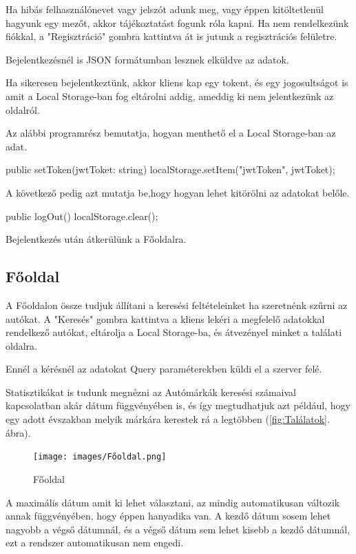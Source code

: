 Ha hibás felhasználónevet vagy jelszót adunk meg, vagy éppen kitöltetlenül hagyunk egy mezőt, akkor tájékoztatást fogunk róla kapni.
Ha nem rendelkezünk fiókkal, a "Regisztráció" gombra kattintva át is jutunk a regisztrációs felületre.

Bejelentkezésnél is JSON formátumban lesznek elküldve az adatok.

Ha sikeresen bejelentkeztünk, akkor kliens kap egy tokent, és egy jogosultságot is amit a Local Storage-ban fog eltárolni addig, ameddig ki nem jelentkezünk az oldalról.

Az alábbi programrész bemutatja, hogyan menthető el a Local Storage-ban az adat.

\begin{java}
public setToken(jwtToket: string) {
    localStorage.setItem("jwtToken", jwtToket);
}
\end{java}
A következő pedig azt mutatja be,hogy hogyan lehet kitörölni az adatokat belőle.

\begin{java}
public logOut(){
    localStorage.clear();
}
\end{java}

Bejelentkezés után átkerülünk a Főoldalra.

\subsection{Főoldal}

A Főoldalon össze tudjuk állítani a keresési feltételeinket ha szeretnénk szűrni az autókat.
A "Keresés" gombra kattintva a kliens lekéri a megfelelő adatokkal rendelkező autókat, eltárolja a Local Storage-ba, és átvezényel minket a találati oldalra.

Ennél a kérésnél az adatokat Query paraméterekben küldi el a szerver felé.

Statisztikákat is tudunk megnézni az Autómárkák keresési számaival kapcsolatban akár dátum függvényében is, és így megtudhatjuk azt például, hogy egy adott évszakban melyik márkára kerestek rá a legtöbben (\ref{fig:Találatok}. ábra).

\begin{figure}[h]
\centering
\texttt{[image: images/Főoldal.png]}
\caption{Főoldal}
\label{fig:Főoldal}
\end{figure}

A maximális dátum amit ki lehet választani, az mindig automatikusan változik annak függvényében, hogy éppen hanyadika van.
A kezdő dátum sosem lehet nagyobb a végső dátumnál, és a végső dátum sem lehet kisebb a kezdő dátumnál, ezt a rendszer automatikusan nem engedi.

